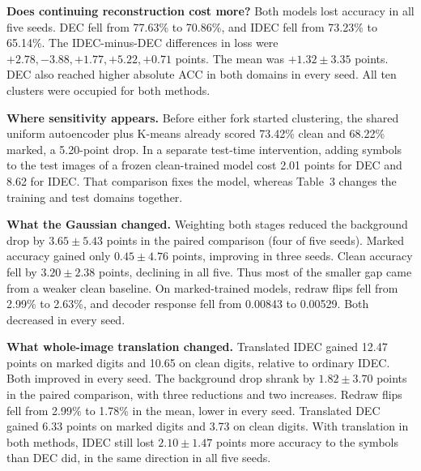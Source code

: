 \textbf{Does continuing reconstruction cost more?} Both models lost accuracy in all five seeds. DEC fell from 77.63\% to 70.86\%, and IDEC fell from 73.23\% to 65.14\%. The IDEC-minus-DEC differences in loss were $+2.78,-3.88,+1.77,+5.22,+0.71$ points. The mean was $+1.32\pm3.35$ points. DEC also reached higher absolute ACC in both domains in every seed. All ten clusters were occupied for both methods.

\textbf{Where sensitivity appears.} Before either fork started clustering, the shared uniform autoencoder plus K-means already scored 73.42\% clean and 68.22\% marked, a 5.20-point drop. In a separate test-time intervention, adding symbols to the test images of a frozen clean-trained model cost 2.01 points for DEC and 8.62 for IDEC. That comparison fixes the model, whereas Table~3 changes the training and test domains together.

\textbf{What the Gaussian changed.} Weighting both stages reduced the background drop by $3.65\pm5.43$ points in the paired comparison (four of five seeds). Marked accuracy gained only $0.45\pm4.76$ points, improving in three seeds. Clean accuracy fell by $3.20\pm2.38$ points, declining in all five. Thus most of the smaller gap came from a weaker clean baseline. On marked-trained models, redraw flips fell from 2.99\% to 2.63\%, and decoder response fell from 0.00843 to 0.00529. Both decreased in every seed.

\textbf{What whole-image translation changed.} Translated IDEC gained 12.47 points on marked digits and 10.65 on clean digits, relative to ordinary IDEC. Both improved in every seed. The background drop shrank by $1.82\pm3.70$ points in the paired comparison, with three reductions and two increases. Redraw flips fell from 2.99\% to 1.78\% in the mean, lower in every seed. Translated DEC gained 6.33 points on marked digits and 3.73 on clean digits. With translation in both methods, IDEC still lost $2.10\pm1.47$ points more accuracy to the symbols than DEC did, in the same direction in all five seeds.

